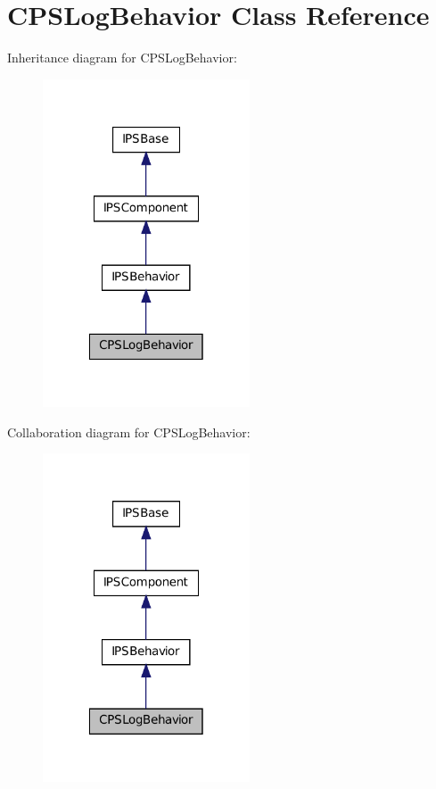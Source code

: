 \hypertarget{classCPSLogBehavior}{
\section{CPSLogBehavior Class Reference}
\label{classCPSLogBehavior}
}


Inheritance diagram for CPSLogBehavior:\nopagebreak
\begin{figure}[H]
\begin{center}
\leavevmode
\includegraphics[width=174pt]{classCPSLogBehavior__inherit__graph}
\end{center}
\end{figure}


Collaboration diagram for CPSLogBehavior:\nopagebreak
\begin{figure}[H]
\begin{center}
\leavevmode
\includegraphics[width=174pt]{classCPSLogBehavior__coll__graph}
\end{center}
\end{figure}
